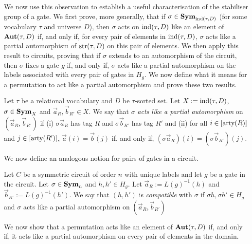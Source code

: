 \documentclass[../main/thesis.tex]{subfiles}
\begin{document}
We now use this observation to establish a useful characterisation of the
stabiliser group of a gate. We first prove, more generally, that if $\sigma \in
\text{\textbf{Sym}}_{\text{\upshape ind}(\tau, D)}$ (for some vocabulary $\tau$ and universe $D$), then
$\sigma$ acts on $\text{\upshape ind}(\tau, D)$ like an element of $\text{\textbf{Aut}}(\tau, D)$ if, and only
if, for every pair of elements in $\text{\upshape ind}(\tau, D)$, $\sigma$ acts like a partial
automorphism of $\text{str}(\tau, D)$ on this pair of elements. We then apply this
result to circuits, proving that if $\sigma$ extends to an automorphism of the
circuit, then $\sigma$ fixes a gate $g$ if, and only if, $\sigma$ acts like a
partial automorphism on the labels associated with every pair of gates in $H_g$.
We now define what it means for a permutation to act like a partial automorphism
and prove these two results.

\begin{definition}
  Let $\tau$ be a relational vocabulary and $D$ be $\tau$-sorted set. Let $X :=
  \text{\upshape ind}(\tau, D)$, $\sigma \in \text{\textbf{Sym}}_X$ and $\vec{a}_R, \vec{b}_{R'} \in X$. We
  say that $\sigma$ \emph{acts like a partial automorphism} on $(\vec{a}_R,
  \vec{b}_{R'})$ if (i) $\sigma \vec{a}_R$ has tag $R$ and $\sigma \vec{b}_{R'}$
  has tag $R'$ and (ii) for all $i \in [\mathrm{arty}(R)]$ and $j \in [\mathrm{arty}(R')]$,
  $\vec{a}(i) = \vec{b}(j)$ if, and only if, $(\sigma \vec{a}_R)(i) = (\sigma
  \vec{b}_{R'})(j)$.
\end{definition}

We now define an analogous notion for pairs of gates in a circuit.

\begin{definition}
  Let $C$ be a symmetric circuit of order $n$ with unique labels and let $g$ be
  a gate in the circuit. Let $\sigma \in \text{\textbf{Sym}}_n$ and $h, h' \in H_g$. Let
  $\vec{a}_R:= L(g)^{-1}(h)$ and $\vec{b}_{R'} := L(g)^{-1}(h')$. We say that
  $(h, h')$ is \emph{compatible} with $\sigma$ if $\sigma h, \sigma h' \in H_g$
  and $\sigma$ acts like a partial automorphism on $(\vec{a}_R, \vec{b}_{R'})$
\end{definition}
  
We now show that a permutation acts like an element of $\text{\textbf{Aut}}(\tau,D)$ if, and
only if, it acts like a partial automorphism on every pair of elements in the
domain.
\end{document}
